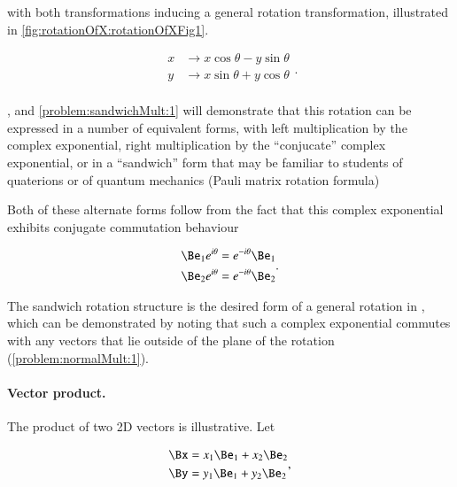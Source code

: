 with both transformations inducing a general rotation transformation, illustrated in \cref{fig:rotationOfX:rotationOfXFig1}.

\begin{dmath}\label{eqn:SimpleProducts2:420}
\begin{aligned}
x &\rightarrow x \cos\theta  - y \sin\theta \\
y &\rightarrow x \sin\theta  + y \cos\theta \\
\end{aligned}.
\end{dmath}

, and \cref{problem:sandwichMult:1} will demonstrate that this rotation can be expressed in a number of equivalent forms, with left multiplication by the complex exponential, right multiplication by the ``conjucate'' complex exponential, or in a ``sandwich'' form that may be familiar to students of quaterions or of quantum mechanics (Pauli matrix rotation formula)


Both of these alternate forms follow from the fact that this complex exponential exhibits conjugate commutation behaviour

\begin{dmath}\label{eqn:SimpleProducts2:480}
\begin{aligned}
   \Be_1 e^{i\theta} &= e^{-i\theta} \Be_1 \\
   \Be_2 e^{i\theta} &= e^{-i\theta} \Be_2 \\
\end{aligned}.
\end{dmath}

The sandwich rotation structure is the desired form of a general rotation in , which can be demonstrated by noting that such a complex exponential commutes with any vectors that lie outside of the plane of the rotation (\cref{problem:normalMult:1}).

\paragraph{Vector product.}

The product of two 2D vectors is illustrative.  Let

\begin{dmath}\label{eqn:SimpleProducts2:500}
\begin{aligned}
   \Bx &= x_1 \Be_1 + x_2 \Be_2 \\
   \By &= y_1 \Be_1 + y_2 \Be_2
\end{aligned},
\end{dmath}


